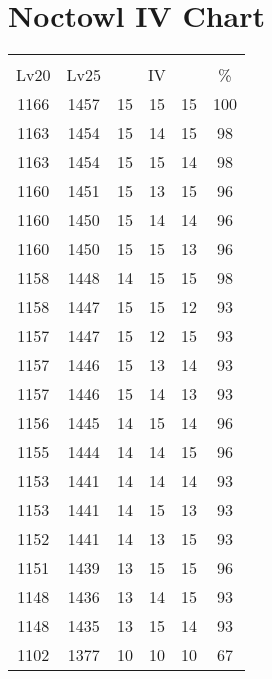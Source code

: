 \documentclass{article}%
\begin{document}
%
\normalsize%
\section{Noctowl IV Chart}%
\label{sec:Noctowl IV Chart}%
\renewcommand{\arraystretch}{1.5}%
\begin{tabular}{|c|c|c|c|c|c|}%
\hline%
\multicolumn{6}{|c|}{\textcolor{white}{ 
\linebreak{Noctowl}
}%
\cellcolor{black}}\\%
\multicolumn{1}{|c}{Lv20}&\multicolumn{1}{c|}{Lv25}&\multicolumn{3}{c|}{IV}&\multicolumn{1}{|c|}{\%}\\%
\hline%
\rowcolor{color100}%
1166&1457&15&15&15&100\\%
\hline%
\rowcolor{color98}%
1163&1454&15&14&15&98\\%
\hline%
\rowcolor{color98}%
1163&1454&15&15&14&98\\%
\hline%
\rowcolor{color96}%
1160&1451&15&13&15&96\\%
\hline%
\rowcolor{color96}%
1160&1450&15&14&14&96\\%
\hline%
\rowcolor{color96}%
1160&1450&15&15&13&96\\%
\hline%
\rowcolor{color98}%
1158&1448&14&15&15&98\\%
\hline%
\rowcolor{color93}%
1158&1447&15&15&12&93\\%
\hline%
\rowcolor{color93}%
1157&1447&15&12&15&93\\%
\hline%
\rowcolor{color93}%
1157&1446&15&13&14&93\\%
\hline%
\rowcolor{color93}%
1157&1446&15&14&13&93\\%
\hline%
\rowcolor{color96}%
1156&1445&14&15&14&96\\%
\hline%
\rowcolor{color96}%
1155&1444&14&14&15&96\\%
\hline%
\rowcolor{color93}%
1153&1441&14&14&14&93\\%
\hline%
\rowcolor{color93}%
1153&1441&14&15&13&93\\%
\hline%
\rowcolor{color93}%
1152&1441&14&13&15&93\\%
\hline%
\rowcolor{color96}%
1151&1439&13&15&15&96\\%
\hline%
\rowcolor{color93}%
1148&1436&13&14&15&93\\%
\hline%
\rowcolor{color93}%
1148&1435&13&15&14&93\\%
\hline%
\rowcolor{color91}%
1102&1377&10&10&10&67\\%
\end{tabular}

%
\end{document}
